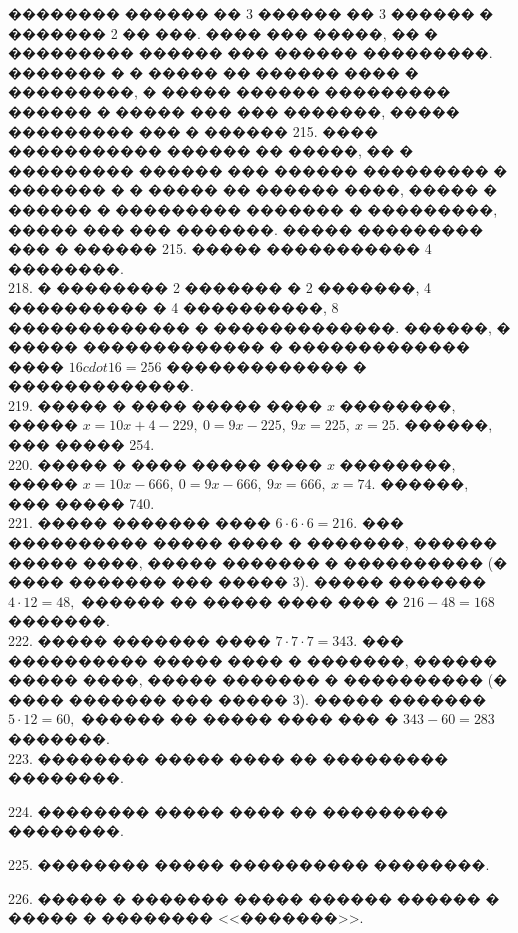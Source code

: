 \documentclass[12pt]{article}
\begin{document}
�������� ������ �� 3 ������ �� 3 ������ � ������� 2 �� ���. ���� ��� �����, �� � ��������� ������ ��� ������ ���������. ������� � � ����� �� ������ ���� � ���������, � ����� ������ ��������� ������ � ����� ��� ��� �������, ����� ��������� ��� � ������ 215. ���� ����������� ������ �� �����, �� � ��������� ������ ��� ������ ��������� � ������� � � ����� �� ������ ����, ����� � ������ � ��������� ������� � ���������, ����� ��� ��� �������. ����� ��������� ��� � ������ 215. ����� ����������� 4 ��������.\\
218. � �������� 2 ������� � 2 �������, 4 ���������� � 4 ����������, 8 ������������� � �������������. ������, � ����� ������������� � ������������� ���� $16cdot16=256$ ������������� � �������������.\\
219. ����� � ���� ����� ���� $x$ ��������, ����� $x=10x+4-229,\ 0=9x-225,\ 9x=225,\ x=25.$ ������, ��� ����� 254.\\
220. ����� � ���� ����� ���� $x$ ��������, ����� $x=10x-666,\ 0=9x-666,\ 9x=666,\ x=74.$ ������, ��� ����� 740.\\
221. ����� ������� ���� $6\cdot6\cdot6=216.$ ��� ���������� ����� ���� � �������, ������ ����� ����, ����� ������� � ���������� (� ���� ������� ��� ����� 3).
����� ������� $4\cdot12=48,$ ������ �� ����� ���� ��� � $216-48=168$ �������.\\
222. ����� ������� ���� $7\cdot7\cdot7=343.$ ��� ���������� ����� ���� � �������, ������ ����� ����, ����� ������� � ���������� (� ���� ������� ��� ����� 3).
����� ������� $5\cdot12=60,$ ������ �� ����� ���� ��� � $343-60=283$ �������.\\
223. �������� ����� ���� �� ��������� ��������.
\begin{center}
\begin{figure}[ht!]
\end{figure}
\end{center}
224. �������� ����� ���� �� ��������� ��������.
\begin{center}
\begin{figure}[ht!]
\end{figure}
\end{center}
225. �������� ����� ���������� ��������.
\begin{center}
\begin{figure}[ht!]
\end{figure}
\end{center}
226. ����� � ������� ����� ������ ������ � ����� � �������� <<�������>>.\\
\end{document}
